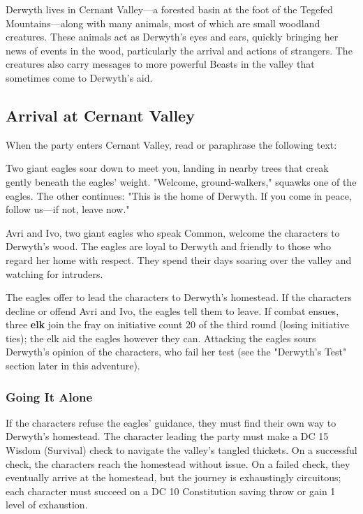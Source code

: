 \documentclass[10pt,a4paper,twoside,bg=print,twocolumn,openany,nodeprecatedcode]{dndbook}
\begin{document}
Derwyth lives in Cernant Valley—a forested basin at the foot of the Tegefed Mountains—along with many animals, most of which are small woodland creatures. These animals act as Derwyth's eyes and ears, quickly bringing her news of events in the wood, particularly the arrival and actions of strangers. The creatures also carry messages to more powerful Beasts in the valley that sometimes come to Derwyth's aid.

\subsection{Arrival at Cernant Valley}
When the party enters Cernant Valley, read or paraphrase the following text:

\begin{DndReadAloud}{}
Two giant eagles soar down to meet you, landing in nearby trees that creak gently beneath the eagles' weight. "Welcome, ground-walkers," squawks one of the eagles. The other continues: "This is the home of Derwyth. If you come in peace, follow us—if not, leave now."

\end{DndReadAloud}

Avri and Ivo, two giant eagles who speak Common, welcome the characters to Derwyth's wood. The eagles are loyal to Derwyth and friendly to those who regard her home with respect. They spend their days soaring over the valley and watching for intruders.

The eagles offer to lead the characters to Derwyth's homestead. If the characters decline or offend Avri and Ivo, the eagles tell them to leave. If combat ensues, three \textbf{elk} join the fray on initiative count 20 of the third round (losing initiative ties); the elk aid the eagles however they can. Attacking the eagles sours Derwyth's opinion of the characters, who fail her test (see the "Derwyth's Test" section later in this adventure).

\subsubsection{Going It Alone}
If the characters refuse the eagles' guidance, they must find their own way to Derwyth's homestead. The character leading the party must make a DC 15 Wisdom (Survival) check to navigate the valley's tangled thickets. On a successful check, the characters reach the homestead without issue. On a failed check, they eventually arrive at the homestead, but the journey is exhaustingly circuitous; each character must succeed on a DC 10 Constitution saving throw or gain 1 level of exhaustion.
\end{document}
